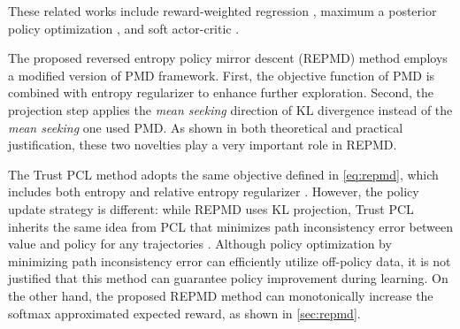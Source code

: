 These related works include reward-weighted regression \citep{peters2007reinforcement,wierstra2008episodic}, maximum a posterior policy optimization \citep{abdolmaleki2018maximum}, and soft actor-critic \citep{haarnoja2018soft}. 

The proposed reversed entropy policy mirror descent (REPMD) method employs a modified version of PMD framework. First, the objective function of PMD is combined with entropy regularizer to enhance further exploration. Second, the projection step applies the \emph{mean seeking} direction of KL divergence instead of the \emph{mean seeking} one used PMD. As shown in both theoretical and practical justification, these two novelties play a very important role in REPMD. 

The Trust PCL method adopts the same objective defined in \cref{eq:repmd}, which includes both entropy and relative entropy regularizer \citep{nachum2017trust}. However, the policy update strategy is different: while REPMD uses KL projection, Trust PCL inherits the same idea from PCL that minimizes path inconsistency error between value and policy for any trajectories \citep{nachum2017bridging}. Although policy optimization by minimizing path inconsistency error can efficiently utilize off-policy data, it is not justified that this method can guarantee policy improvement during learning. On the other hand, the proposed REPMD method can monotonically increase the softmax approximated expected reward, as shown in \cref{sec:repmd}.
